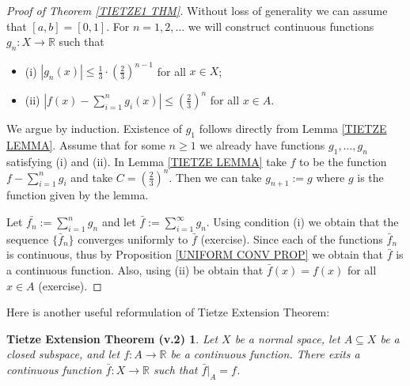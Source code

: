 \documentclass[11pt, letterpaper, oneside]{report}
\theoremstyle{pplain}
\newtheorem{TIETZE2}[theorem]{Tietze Extension Theorem (v.2)}
\newtheorem{ITERMVALUE THM}[theorem]{Intermediate Value Theorem}
\newtheorem{HEINEBOREL THM}[theorem]{Heine-Borel Theorem}
\newtheorem{UMETR THM}[theorem]{Urysohn Metrization Theorem}
\newtheorem{UMETR2 THM}[theorem]{Urysohn Metrization Theorem (v.2)}
\theoremstyle{ddefinition}
\theoremstyle{nnn}
\newtheorem{TDA NN}[theorem]{Topological Data Analysis. }
\theoremstyle{eexercise}
\newcommand{\R}{{\mathbb R}}
\newcommand{\bit}{\begin{itemize}}
\newcommand{\eit}{\end{itemize}}
\begin{document}
\begin{proof}[Proof of Theorem \ref{TIETZE1 THM}]
Without loss of generality we can assume that $[a, b] = [0, 1]$. For $n=1, 2, \dots$ we will construct 
continuous functions $g_{n}\colon X\to \R$ such that 
\bit
\item[(i)] $|g_{n}(x)| \leq \frac{1}{3}\cdot \left( \frac{2}{3}\right)^{n-1}$ for all $x\in X$;
\item[(ii)] $\left| f(x) - \sum_{i=1}^{n}g_{i}(x) \right| \leq \left(\frac{2}{3}\right)^{n}$ for all $x\in A$.
\eit
We argue by induction. Existence of $g_{1}$ follows directly from Lemma \ref{TIETZE LEMMA}. 
Assume that for some $n\geq 1$ we already have functions $g_{1}, \dots, g_{n}$ satisfying 
(i) and (ii). In Lemma \ref{TIETZE LEMMA} take $f$ to be the function $ f-\sum_{i=1}^{n} g_{i}$
and take $C= \left(\frac{2}{3}\right)^{n}$. Then we can take $g_{n+1} := g$ where $g$ is the function 
given by the lemma. 

Let $\bar{f_{n}} := \sum_{i=1}^{n} g_{n}$ and let $\bar{f} := \sum_{i=1}^{\infty} g_{n}$. Using 
condition (i) we obtain that the sequence $\{\bar{f}_{n}\}$ converges uniformly to $\bar{f}$
(exercise). Since each of the functions $\bar{f}_{n}$ is continuous, thus  by Proposition 
\ref{UNIFORM CONV PROP} we obtain that $\bar{f}$ is a continuous function. Also, using (ii)
be obtain that $\bar{f}(x) = f(x)$ for all $x\in A$ (exercise).  
\end{proof}


Here is another useful reformulation of Tietze Extension Theorem: 

\begin{TIETZE2}
\label{TIETZE2 THM}
Let $X$ be a normal space, let $A\subseteq X$ be a closed subspace, and let 
$f\colon A\to \R$ be a continuous function. There exits a continuous function 
$\bar{f}\colon X \to \R$ such that $\bar{f}|_{A} = f$. 
\end{TIETZE2}  
 
\end{document}

